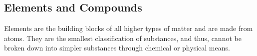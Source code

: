 \subsection{Elements and Compounds}

\begin{defn}
Elements are the building blocks of all higher types of matter and are made from atoms. They are the smallest classification of substances, and thus, cannot be broken down into simpler substances through chemical or physical means. 
\end{defn}

